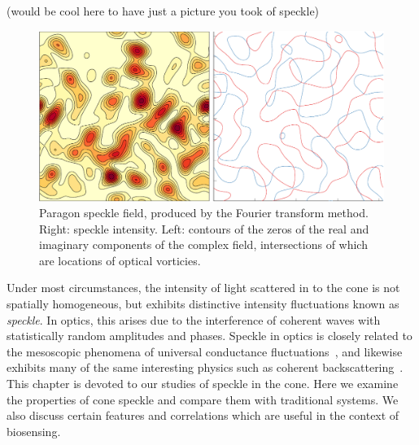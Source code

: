 (would be cool here to have just a picture you took of speckle)
\begin{figure}[ht]
\centering
\includegraphics[keepaspectratio,width=15cm]{speckle/figures/introfig.pdf}
\caption{Paragon speckle field, produced by the Fourier transform method.
								Right: speckle intensity.  Left: contours of the zeros of the real
								and imaginary components of the complex field, intersections of
								which are locations of optical vorticies.}
\label{fig:examplespeckle}
\end{figure}

Under most circumstances, the intensity of light scattered in to the cone
is not spatially homogeneous, but exhibits distinctive intensity
fluctuations known as \textit{speckle}.  In optics, this arises due to the
interference of coherent waves with statistically random amplitudes and
phases.  Speckle in optics is closely related to the mesoscopic phenomena
of universal conductance fluctuations~\cite{lee1985universal}, and likewise
exhibits many of the same interesting physics such as coherent
backscattering~\cite{akkermans1986coherent}.  This chapter is devoted to
our studies of speckle in the cone.  Here we examine the properties of cone
speckle and compare them with traditional systems.  We also discuss certain
features and correlations which are useful in the context of biosensing.
